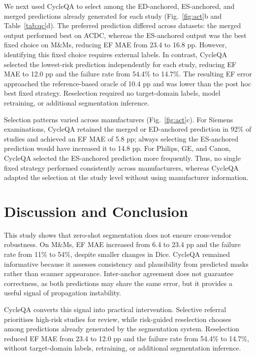\documentclass[runningheads]{llncs}
\newcommand{\CQ}{CycleQA}
\begin{document}
\vspace{-0.5cm}
We next used \CQ{} to select among the ED-anchored, ES-anchored, and merged predictions already generated for each study (Fig.~\ref{fig:act}b and Table~\ref{tab:qc}d). The preferred prediction differed across datasets: the merged output performed best on ACDC, whereas the ES-anchored output was the best fixed choice on M\&Ms, reducing EF MAE from 23.4 to 16.8 pp. However, identifying this fixed choice requires external labels. In contrast, \CQ{} selected the lowest-risk prediction independently for each study, reducing EF MAE to 12.0 pp and the failure rate from 54.4\% to 14.7\%. The resulting EF error approached the reference-based oracle of 10.4 pp and was lower than the post hoc best fixed strategy. Reselection required no target-domain labels, model retraining, or additional segmentation inference.

Selection patterns varied across manufacturers (Fig.~\ref{fig:act}c). For Siemens examinations, \CQ{} retained the merged or ED-anchored prediction in 92\% of studies and achieved an EF MAE of 5.8 pp; always selecting the ES-anchored prediction would have increased it to 14.8 pp. For Philips, GE, and Canon, \CQ{} selected the ES-anchored prediction more frequently. Thus, no single fixed strategy performed consistently across manufacturers, whereas \CQ{} adapted the selection at the study level without using manufacturer information.

\section{Discussion and Conclusion}

This study shows that zero-shot segmentation does not ensure cross-vendor robustness. On M\&Ms, EF MAE increased from 6.4 to 23.4 pp and the failure rate from 11\% to 54\%, despite smaller changes in Dice. \CQ{} remained informative because it assesses consistency and plausibility from predicted masks rather than scanner appearance. Inter-anchor agreement does not guarantee correctness, as both predictions may share the same error, but it provides a useful signal of propagation instability.

\CQ{} converts this signal into practical intervention. Selective referral prioritises high-risk studies for review, while risk-guided reselection chooses among predictions already generated by the segmentation system. Reselection reduced EF MAE from 23.4 to 12.0 pp and the failure rate from 54.4\% to 14.7\%, without target-domain labels, retraining, or additional segmentation inference.
\end{document}
